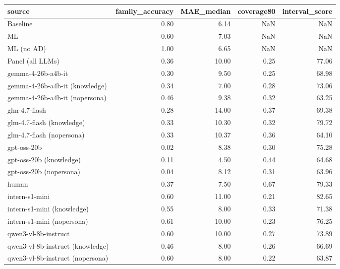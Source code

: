 \begin{tabular}{lrrrr}
\toprule
source & family\_accuracy & MAE\_median & coverage80 & interval\_score \\
\midrule
Baseline & 0.80 & 6.14 & NaN & NaN \\
ML & 0.60 & 7.03 & NaN & NaN \\
ML (no AD) & 1.00 & 6.65 & NaN & NaN \\
Panel (all LLMs) & 0.36 & 10.00 & 0.25 & 77.06 \\
gemma-4-26b-a4b-it & 0.30 & 9.50 & 0.25 & 68.98 \\
gemma-4-26b-a4b-it (knowledge) & 0.34 & 7.00 & 0.28 & 73.06 \\
gemma-4-26b-a4b-it (nopersona) & 0.46 & 9.38 & 0.32 & 63.25 \\
glm-4.7-flash & 0.28 & 14.00 & 0.37 & 69.38 \\
glm-4.7-flash (knowledge) & 0.33 & 10.30 & 0.32 & 79.72 \\
glm-4.7-flash (nopersona) & 0.33 & 10.37 & 0.36 & 64.10 \\
gpt-oss-20b & 0.02 & 8.38 & 0.30 & 75.28 \\
gpt-oss-20b (knowledge) & 0.11 & 4.50 & 0.44 & 64.68 \\
gpt-oss-20b (nopersona) & 0.04 & 8.12 & 0.31 & 63.96 \\
human & 0.37 & 7.50 & 0.67 & 79.33 \\
intern-s1-mini & 0.60 & 11.00 & 0.21 & 82.65 \\
intern-s1-mini (knowledge) & 0.55 & 8.00 & 0.33 & 71.38 \\
intern-s1-mini (nopersona) & 0.61 & 10.00 & 0.23 & 76.25 \\
qwen3-vl-8b-instruct & 0.60 & 10.00 & 0.27 & 73.89 \\
qwen3-vl-8b-instruct (knowledge) & 0.46 & 8.00 & 0.26 & 66.69 \\
qwen3-vl-8b-instruct (nopersona) & 0.60 & 8.00 & 0.22 & 63.87 \\
\bottomrule
\end{tabular}
